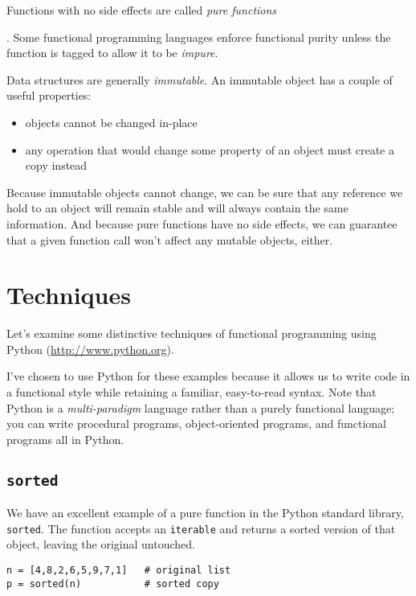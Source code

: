 \documentclass{article}\usepackage{beamerarticle}
\begin{document}
\begin{frame}
Functions with no side effects are called \textit{pure functions}%
\end{frame}.
Some functional programming languages enforce functional purity unless the function is tagged to allow it to be \textit{impure}.
\begin{frame}%
Data structures are generally \textit{immutable}. An immutable object has a couple of useful properties:
\begin{itemize}
\pause \item objects cannot be changed in-place
\pause \item any operation that would change some property of an object must create a copy instead
\end{itemize}
\end{frame}
\noindent Because immutable objects cannot change, we can be sure that any reference we hold to an object will remain stable and will always contain the same information. And because pure functions have no side effects, we can guarantee that a given function call won't affect any mutable objects, either.

\section{Techniques}
\begin{frame}
Let's examine some distinctive techniques of functional programming using Python (\url{http://www.python.org}).
\end{frame}%
I've chosen to use Python for these examples because it allows us to write code in a functional style while retaining a familiar, easy-to-read syntax. Note that Python is a \textit{multi-paradigm} language rather than a purely functional language; you can write procedural programs, object-oriented programs, and functional programs all in Python.

\subsection{\tt sorted}
We have an excellent example of a pure function in the Python standard library, \texttt{sorted}. The function accepts an \texttt{iterable} and returns a sorted version of that object, leaving the original untouched.

\begin{frame}[fragile]
\begin{lstlisting}[style=python,caption={Sorting a List},label={lst:sorted}]
n = [4,8,2,6,5,9,7,1]   # original list
p = sorted(n)           # sorted copy
\end{lstlisting}
\end{frame}
\end{document}
